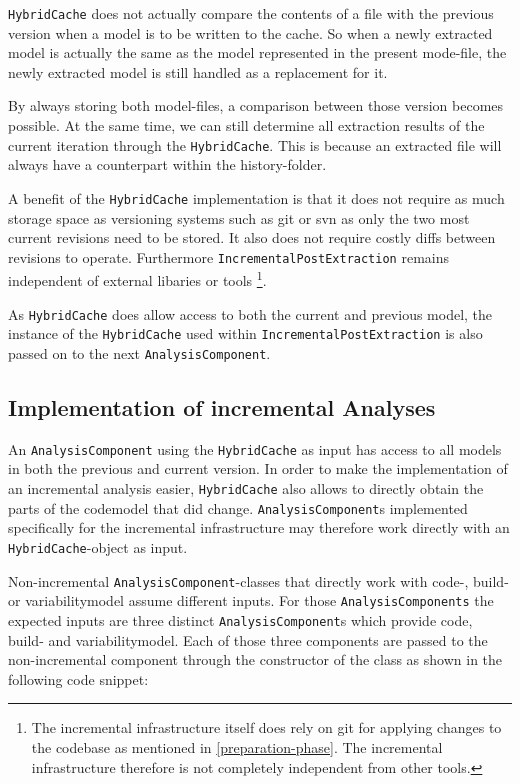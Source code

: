 \documentclass[a4paper]{article}
\begin{document}
 \texttt{HybridCache} does not actually compare the contents of a file with the previous version when a model is to be written to the cache. So when a newly extracted model is actually the same as the model represented in the present mode-file, the newly extracted model is still handled as a replacement for it. 
  
 By always storing both model-files, a comparison between those version becomes possible. At the same time, we can still determine all extraction results of the current iteration through the \texttt{HybridCache}. This is because an extracted file will always have a counterpart within the history-folder.
   
 A benefit of the \texttt{HybridCache} implementation is that it does not require as much storage space as versioning systems such as git or svn as only the two most current revisions need to be stored. It also does not require costly diffs between revisions to operate. Furthermore \texttt{IncrementalPostExtraction} remains independent of external libaries or tools \footnote{The incremental infrastructure itself does rely on git for applying changes to the codebase as mentioned in \autoref{preparation-phase}. The incremental infrastructure therefore is not completely independent from other tools.}.
 
As \texttt{HybridCache} does allow access to both the current and previous model, the instance of the \texttt{HybridCache} used within \texttt{IncrementalPostExtraction} is also passed on to the next \texttt{AnalysisComponent}. 
  
\subsection{Implementation of incremental Analyses}

An \texttt{AnalysisComponent} using the \texttt{HybridCache} as input has access to all models in both the previous and current version. In order to make the implementation of an incremental analysis easier, \texttt{HybridCache} also allows to directly obtain the parts of the codemodel that did change. \texttt{AnalysisComponent}s implemented specifically for the incremental infrastructure may therefore work directly with an \texttt{HybridCache}-object as input. 

Non-incremental \texttt{AnalysisComponent}-classes that directly work with code-, build- or variabilitymodel assume different inputs. For those \texttt{AnalysisComponents} the expected inputs are three distinct \texttt{AnalysisComponent}s which provide code, build- and variabilitymodel. Each of those three components are passed to the non-incremental component through the constructor of the class as shown in the following code snippet:
\end{document}
